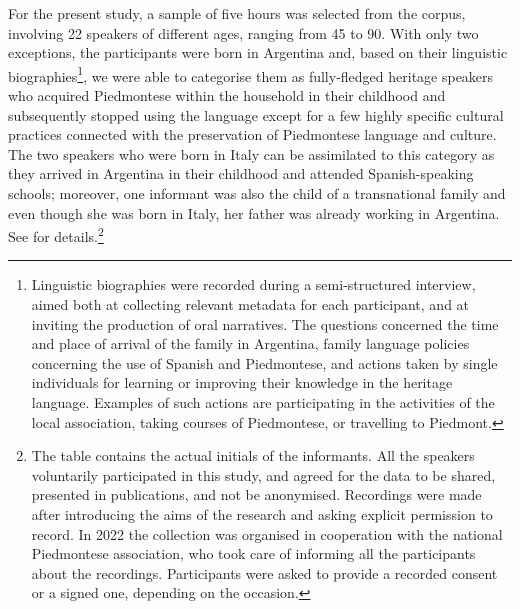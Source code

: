 \documentclass[output=paper]{langscibook}
\begin{document}
For the present study, a sample of five hours was selected from the corpus, involving 22 speakers of different ages, ranging from 45 to 90. With only two exceptions, the participants were born in Argentina and, based on their linguistic biographies\footnote{Linguistic biographies were recorded during a semi-structured interview, aimed both at collecting relevant metadata for each participant, and at inviting the production of oral narratives. The questions concerned the time and place of arrival of the family in Argentina, family language policies concerning the use of Spanish and Piedmontese, and actions taken by single individuals for learning or improving their knowledge in the heritage language. Examples of such actions are participating in the activities of the local association, taking courses of Piedmontese, or travelling to Piedmont.}, we were able to categorise them as fully-fledged heritage speakers who acquired Piedmontese within the household in their childhood and subsequently stopped using the language except for a few highly specific cultural practices connected with the preservation of Piedmontese language and culture. The two speakers who were born in Italy can be assimilated to this category as they arrived in Argentina in their childhood and attended Spanish-speaking schools; moreover, one informant was also the child of a transnational family and even though she was born in Italy, her father was already working in Argentina. See  for details.\footnote{The table contains the actual initials of the informants. All the speakers voluntarily participated in this study, and agreed for the data to be shared, presented in publications, and not be anonymised. Recordings were made after introducing the aims of the research and asking explicit permission to record.  {In 2022} the collection was organised in cooperation with the national Piedmontese association, who took care of informing all the participants about the recordings. Participants were asked to provide a recorded consent or a signed one, depending on the occasion.}
\end{document}
